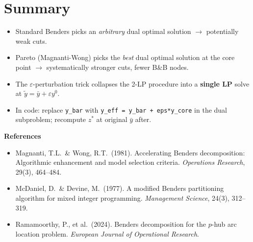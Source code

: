 \documentclass[12pt,a4paper]{article}
\begin{document}
\section{Summary}

\begin{tcolorbox}[colback=lightgreen,title=\textbf{Take-Away}]
\begin{itemize}
  \item Standard Benders picks an \emph{arbitrary} dual optimal solution
        $\to$ potentially weak cuts.
  \item Pareto (Magnanti-Wong) picks the \emph{best} dual optimal solution
        at the core point $\to$ systematically stronger cuts, fewer B\&B nodes.
  \item The $\varepsilon$-perturbation trick collapses the 2-LP procedure into
        a \textbf{single LP} solve at $\tilde{y} = \bar{y} + \varepsilon y^0$.
  \item In code: replace \texttt{y\_bar} with \texttt{y\_eff = y\_bar + eps*y\_core}
        in the dual subproblem; recompute $z^*$ at original $\bar{y}$ after.
\end{itemize}
\end{tcolorbox}

\vspace{1em}
\noindent\textbf{References}
\begin{itemize}
  \item Magnanti, T.L.\ \& Wong, R.T.\ (1981). Accelerating Benders decomposition:
        Algorithmic enhancement and model selection criteria. \emph{Operations Research}, 29(3), 464--484.
  \item McDaniel, D.\ \& Devine, M.\ (1977). A modified Benders partitioning algorithm
        for mixed integer programming. \emph{Management Science}, 24(3), 312--319.
  \item Ramamoorthy, P., et al.\ (2024). Benders decomposition for the $p$-hub arc
        location problem. \emph{European Journal of Operational Research}.
\end{itemize}
\end{document}
